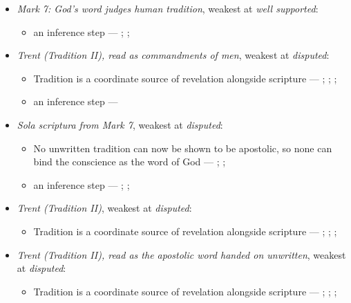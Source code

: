 \documentclass[11pt]{article}
\begin{document}
\begin{itemize}
\item \emph{Mark 7: God’s word judges human tradition}, weakest at \emph{well supported}:
\begin{itemize}
\item an inference step --- \cite[Vatican II (1965), Dei Verbum 10]{tanner-decrees-1990}; \cite[IV.x.23]{calvin-institutes-1960}; \cite[15--16]{wenham-our-lords-view-1953}
\end{itemize}
\item \emph{Trent (Tradition II), read as commandments of men}, weakest at \emph{disputed}:
\begin{itemize}
\item Tradition is a coordinate source of revelation alongside scripture --- \cite[Trent, Session IV (1546), Decree on Sacred Books and Traditions]{tanner-decrees-1990}; \cite{mathison-shape-sola-scriptura-2001}; \cite{geiselmann-meaning-of-tradition-1966}; \cite{congar-tradition-and-traditions-1966}
\item an inference step --- \cite[IV.x.23]{calvin-institutes-1960}
\end{itemize}
\item \emph{Sola scriptura from Mark 7}, weakest at \emph{disputed}:
\begin{itemize}
\item No unwritten tradition can now be shown to be apostolic, so none can bind the conscience as the word of God --- \cite[503--511]{whitaker-disputation-1849}; \cite[594]{whitaker-disputation-1849}; \cite[I.6]{westminster-confession-1647}
\item an inference step --- \cite{geiselmann-meaning-of-tradition-1966}; \cite[Vatican I (1870), Pastor Aeternus, ch. 4]{tanner-decrees-1990}; \cite{florovsky-bible-church-tradition-1972}
\end{itemize}
\item \emph{Trent (Tradition II)}, weakest at \emph{disputed}:
\begin{itemize}
\item Tradition is a coordinate source of revelation alongside scripture --- \cite[Trent, Session IV (1546), Decree on Sacred Books and Traditions]{tanner-decrees-1990}; \cite{mathison-shape-sola-scriptura-2001}; \cite{geiselmann-meaning-of-tradition-1966}; \cite{congar-tradition-and-traditions-1966}
\end{itemize}
\item \emph{Trent (Tradition II), read as the apostolic word handed on unwritten}, weakest at \emph{disputed}:
\begin{itemize}
\item Tradition is a coordinate source of revelation alongside scripture --- \cite[Trent, Session IV (1546), Decree on Sacred Books and Traditions]{tanner-decrees-1990}; \cite{mathison-shape-sola-scriptura-2001}; \cite{geiselmann-meaning-of-tradition-1966}; \cite{congar-tradition-and-traditions-1966}
\end{itemize}
\end{itemize}
\end{document}
